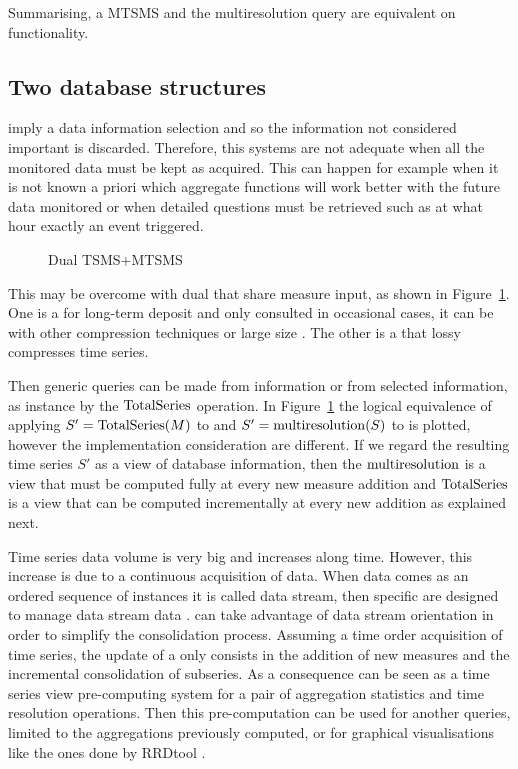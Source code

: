 Summarising, a MTSMS and the multiresolution query are equivalent on
functionality.



\subsection{Two database structures}

 imply a data information selection and so the information
not considered important is discarded.  Therefore, this systems are
not adequate when all the monitored data must be kept as
acquired. This can happen for example when it is not known a priori
which aggregate functions will work better with the future data
monitored or when detailed questions must be retrieved such as at what
hour exactly an event triggered. 

\begin{figure}
  \centering
  
  \caption{Dual TSMS+MTSMS}
  \label{fig:model:mtsms-tsms}
\end{figure}

This may be overcome with dual  that share measure input,
as shown in Figure~\ref{fig:model:mtsms-tsms}. One is a 
for long-term deposit and only consulted in occasional cases, it can
be  with other compression techniques or large size
. The other is a  that lossy compresses time
series.

Then generic queries can be made from  information or from
 selected information, as instance by the $\operatorname{TotalSeries}$
operation. In Figure~\ref{fig:model:mtsms-tsms} the logical
equivalence of applying $S'=\operatorname{TotalSeries}(M)$ to  and
$S'=\operatorname{multiresolution}(S)$ to  is plotted, however the
implementation consideration are different. If we regard the resulting
time series $S'$ as a view of database information, then the
$\operatorname{multiresolution}$ is a view that must be computed fully at every new
measure addition and $\operatorname{TotalSeries}$ is a view that can be computed
incrementally at every new addition as explained next.


Time series data volume is very big and increases along time. However,
this increase is due to a continuous acquisition of data. When data
comes as an ordered sequence of instances it is called data stream,
then specific  are designed to manage data stream data
\cite{stonebraker05:sigmod}.   can take advantage of data
stream orientation in order to simplify the consolidation process.
Assuming a time order acquisition of time series, the update of a
 only consists in the addition of new measures and the
incremental consolidation of subseries.  As a consequence 
can be seen as a time series view pre-computing system for a pair of
aggregation statistics and time resolution operations.  Then this
pre-computation can be used for another queries, limited to the
aggregations previously computed, or for graphical visualisations like
the ones done by RRDtool \cite{rrdtool}.

